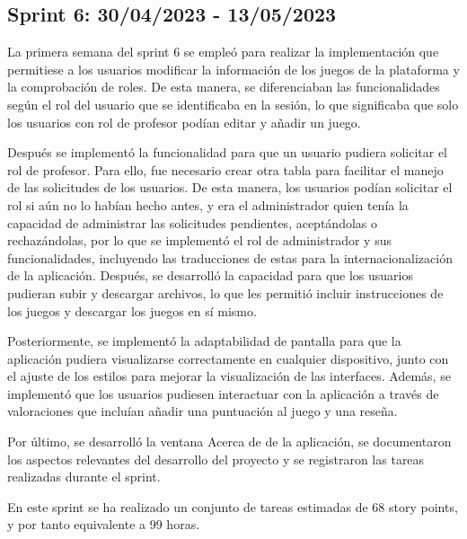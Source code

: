 \subsection{Sprint 6: 30/04/2023 - 13/05/2023}
La primera semana del sprint 6 se empleó para realizar la implementación que permitiese a los usuarios modificar la información de los juegos de la plataforma y la comprobación de roles. De esta manera, se diferenciaban las funcionalidades según el rol del usuario que se identificaba en la sesión, lo que significaba que solo los usuarios con rol de profesor podían editar y añadir un juego.

Después se implementó la funcionalidad para que un usuario pudiera solicitar el rol de profesor. Para ello, fue necesario crear otra tabla para facilitar el manejo de las solicitudes de los usuarios. De esta manera, los usuarios podían solicitar el rol si aún no lo habían hecho antes, y era el administrador quien tenía la capacidad de administrar las solicitudes pendientes, aceptándolas o rechazándolas, por lo que se implementó el rol de administrador y sus funcionalidades, incluyendo las traducciones de estas para la internacionalización de la aplicación.
Después, se desarrolló la capacidad para que los usuarios pudieran subir y descargar archivos, lo que les permitió incluir instrucciones de los juegos y descargar los juegos en sí mismo.

Posteriormente, se implementó la adaptabilidad de pantalla para que la aplicación pudiera visualizarse correctamente en cualquier dispositivo, junto con el ajuste de los estilos para mejorar la visualización de las interfaces. Además, se implementó que los usuarios pudiesen interactuar con la aplicación a través de valoraciones que incluían añadir una puntuación al juego y una reseña.

Por último, se desarrolló la ventana Acerca de de la aplicación, se documentaron los aspectos relevantes del desarrollo del proyecto y se registraron las tareas realizadas durante el sprint.

En este sprint se ha realizado un conjunto de tareas estimadas de 68 story points, y por tanto equivalente a 99 horas.

